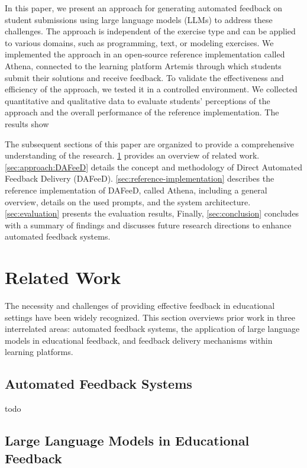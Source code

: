 \documentclass[manuscript,screen,review]{acmart}
\begin{document}
In this paper, we present an approach for generating automated feedback on student submissions using large language models (LLMs) to address these challenges.
The approach is independent of the exercise type and can be applied to various domains, such as programming, text, or modeling exercises.
We implemented the approach in an open-source reference implementation called Athena, connected to the learning platform Artemis through which students submit their solutions and receive feedback.
To validate the effectiveness and efficiency of the approach, we tested it in a controlled environment. 
We collected quantitative and qualitative data to evaluate students' perceptions of the approach and the overall performance of the reference implementation.
The results show %


The subsequent sections of this paper are organized to provide a comprehensive understanding of the research. 
\cref{sec:related-work} provides an overview of related work. 
\cref{sec:approach:DAFeeD} details the concept and methodology of Direct Automated Feedback Delivery (DAFeeD).
\cref{sec:reference-implementation} describes the reference implementation of DAFeeD, called Athena, including a general overview, details on the used prompts, and the system architecture. 
\cref{sec:evaluation} presents the evaluation results, %
Finally, \cref{sec:conclusion} concludes with a summary of findings and discusses future research directions to enhance automated feedback systems.

\newpage
\section{Related Work} %
\label{sec:related-work}

The necessity and challenges of providing effective feedback in educational settings have been widely recognized. This section overviews prior work in three interrelated areas: automated feedback systems, the application of large language models in educational feedback, and feedback delivery mechanisms within learning platforms.

\subsection{Automated Feedback Systems}

todo
\cite{hahn:2021:SystematicReviewEffects}

\subsection{Large Language Models in Educational Feedback}
\end{document}

